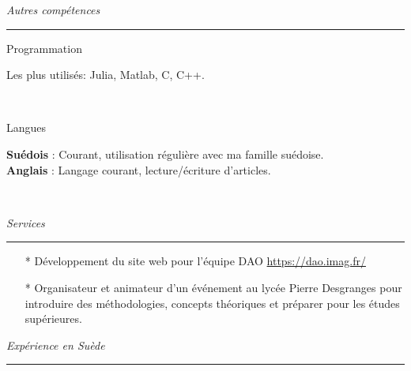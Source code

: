 \documentclass[a4paper,10pt, french]{article}
\begin{document}
\vspace{5mm}

\noindent
\textit{\Large \color{MyGray} \hspace{5mm} Autres compétences}
\vspace{2mm}
{\color{DefaultGray}\hrule height .1pt}
\vspace{5mm}

\noindent
\begin{minipage}{0.20\textwidth}
	\color{MyGray} Programmation
\end{minipage}
\hfill
\begin{minipage}{0.70\textwidth}
	Les plus utilisés: Julia, Matlab, C, C++.\\
\end{minipage}\\
\vspace{2mm}

\noindent
\begin{minipage}{0.20\textwidth}
	\color{MyGray} Langues
\end{minipage}
\hfill
\begin{minipage}{0.70\textwidth}
	\textbf{Suédois} : Courant, utilisation régulière avec ma famille suédoise.\\
	\textbf{Anglais} : Langage courant, lecture/écriture d'articles.\\
\end{minipage}\\
\vspace{2mm}

\noindent
\textit{\Large \color{MyGray} \hspace{5mm} Services}
\vspace{2mm}
{\color{DefaultGray}\hrule height .1pt}
\vspace{5mm}

\begin{itemize}
	\setlength\itemsep{3mm}
	\item[*] Développement du site web pour l'équipe DAO \url{https://dao.imag.fr/}
	\item[*] Organisateur et animateur d'un événement au lycée Pierre Desgranges pour introduire des méthodologies, concepts théoriques et préparer pour les études supérieures.
\end{itemize}
\vspace{5mm}

\noindent
\textit{\Large \color{MyGray} \hspace{5mm} Expérience en Suède}
\vspace{2mm}
{\color{DefaultGray}\hrule height .1pt}
\vspace{5mm}
\end{document}
